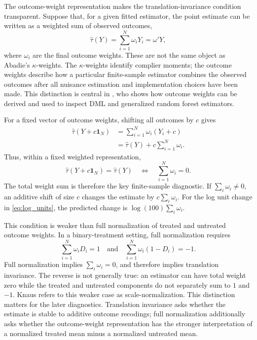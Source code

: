 \documentclass{article}
\begin{document}
The outcome-weight representation makes the translation-invariance condition
transparent. Suppose that, for a given fitted estimator, the point estimate can be
written as a weighted sum of observed outcomes,
\begin{equation}
    \hat\tau(Y)=\sum_{i=1}^N \omega_iY_i=\omega'Y,
    \label{eq:ow_rep_ch2}
\end{equation}
where \(\omega_i\) are the final outcome weights. These are not the same object
as Abadie's \(\kappa\)-weights. The \(\kappa\)-weights identify complier moments;
the outcome weights describe how a particular finite-sample estimator combines
the observed outcomes after all nuisance estimation and implementation choices
have been made. This distinction is central in \citet{knaus2024treatment}, who
shows how outcome weights can be derived and used to inspect DML and generalized
random forest estimators.

For a fixed vector of outcome weights, shifting all outcomes by \(c\) gives
\begin{align}
    \hat\tau(Y+c\mathbf{1}_N)
    &= \sum_{i=1}^N \omega_i(Y_i+c) \nonumber\\
    &= \hat\tau(Y)+c\sum_{i=1}^N\omega_i .
    \label{eq:ti_shift}
\end{align}
Thus, within a fixed weighted representation,
\begin{equation}
    \hat\tau(Y+c\mathbf{1}_N)=\hat\tau(Y)
    \quad\Longleftrightarrow\quad
    \sum_{i=1}^N\omega_i=0.
    \label{eq:ti_sumzero_ch2}
\end{equation}
The total weight sum is therefore the key finite-sample diagnostic. If
\(\sum_i\omega_i\neq0\), an additive shift of size \(c\) changes the estimate by
\(c\sum_i\omega_i\). For the log unit change in \eqref{eq:log_units}, the
predicted change is \(\log(100)\sum_i\omega_i\).

This condition is weaker than full normalization of treated and untreated outcome
weights. In a binary-treatment setting, full normalization requires
\begin{equation}
    \sum_{i=1}^N\omega_iD_i=1
    \quad\text{and}\quad
    \sum_{i=1}^N\omega_i(1-D_i)=-1.
    \label{eq:full_normalization}
\end{equation}
Full normalization implies \(\sum_i\omega_i=0\), and therefore implies
translation invariance. The reverse is not generally true: an estimator can have
total weight zero while the treated and untreated components do not separately
sum to \(1\) and \(-1\). Knaus refers to this weaker case as scale-normalization.
This distinction matters for the later diagnostics. Translation invariance asks
whether the estimate is stable to additive outcome recodings; full normalization
additionally asks whether the outcome-weight representation has the stronger
interpretation of a normalized treated mean minus a normalized untreated mean.
\end{document}
